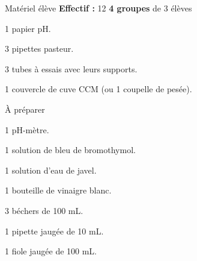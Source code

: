 
\begin{boiteMateriel}{Matériel élève}
  \textbf{Effectif :} 12
  \qq{}\qq{}
  \flecheLongue \textbf{4 groupes} de 3 élèves

  \begin{protocole}[2]
    \item 1 papier pH.
    \item 3 pipettes pasteur.
    \item 3 tubes à essais avec leurs supports.
    \item 1 couvercle de cuve CCM (ou 1 coupelle de pesée).
  \end{protocole}
\end{boiteMateriel}


\begin{boiteMateriel}{À préparer}
  \begin{protocole}
    \item 1 pH-mètre.
    \item 1 solution de bleu de bromothymol.
    \item 1 solution d'eau de javel.
    \item 1 bouteille de vinaigre blanc.
    \item 3 béchers de 100 mL.
    \item 1 pipette jaugée de 10 mL.
    \item 1 fiole jaugée de 100 mL.
  \end{protocole}
\end{boiteMateriel}